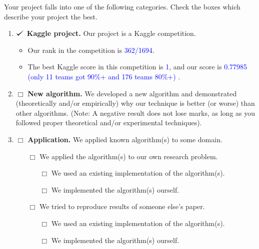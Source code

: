 \documentclass[11pt]{article}
\def\checkmark{\tikz\fill[scale=0.4](0,.35) -- (.25,0) -- (1,.7) -- (.25,.15) -- cycle;}
\begin{document}
Your project falls into one of the following categories. Check the
boxes which describe your project the best.

\begin{enumerate}

\item \textcolor{blue}{$\checkmark$} \textbf{Kaggle project.} Our project is a Kaggle competition.
    \begin{itemize}
        \item Our rank in the competition is \textcolor{blue}{362/1694}. 
        \item The best Kaggle score in this competition is \textcolor{blue}{1}, and our score is \textcolor{blue}{0.77985 (only 11 teams got 90$\%$+ and 176 teams 80$\%$+)} .
    \end{itemize}

\item $\Box$ \textbf{New algorithm.} We developed a new algorithm and demonstrated (theoretically and/or empirically) why our technique is better (or worse) than other algorithms. (Note: A negative result does not lose marks, as long as  you followed proper theoretical and/or experimental techniques).

\item $\Box$ \textbf{Application.} We applied known algorithm(s) to some domain.
\begin{itemize}
\item [$\Box$] We applied the algorithm(s) to our own research
problem.
\begin{itemize}
\item [$\Box$] We used an existing implementation of the
algorithm(s).  \item [$\Box$] We implemented the algorithm(s)
ourself.
\end{itemize}
 \item [$\Box$] We tried to reproduce results of someone
else's paper.
\begin{itemize}
\item [$\Box$] We used an existing implementation of the
algorithm(s).  \item [$\Box$] We implemented the algorithm(s)
ourself.
\end{itemize}
\end{itemize} 


\end{enumerate}
\end{document}
